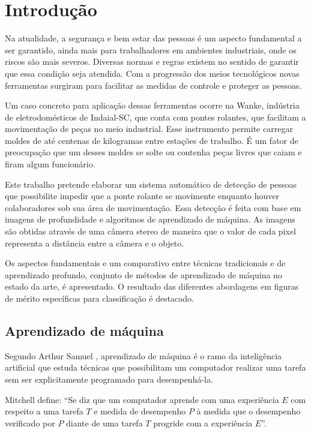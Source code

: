 \chapter{Introdução}

Na atualidade, a segurança e bem estar das pessoas é um aspecto fundamental a ser garantido, ainda mais para trabalhadores em ambientes industriais, onde os riscos são mais severos. Diversas normas e regras existem no sentido de garantir que essa condição seja atendida. Com a progressão dos meios tecnológicos novas ferramentas surgiram para facilitar as medidas de controle e proteger as pessoas.

Um caso concreto para aplicação dessas ferramentas ocorre na Wanke, indústria de eletrodomésticos de Indaial-SC, que conta com pontes rolantes, que facilitam a movimentação de peças no meio industrial. Esse instrumento permite carregar moldes de até centenas de kilogramas entre estações de trabalho. É um fator de preocupação que um desses moldes se solte ou contenha peças livres que caiam e firam algum funcionário. 

Este trabalho pretende elaborar um sistema automático de detecção de pessoas que possibilite impedir que a ponte rolante se movimente enquanto houver colaboradores sob sua área de movimentação. Essa detecção é feita com base em imagens de profundidade e algoritmos de aprendizado de máquina. As imagens são obtidas através de uma câmera stereo de maneira que o valor de cada pixel representa a distância entre a câmera e o objeto. 

Os aspectos fundamentais e um comparativo entre técnicas tradicionais e de aprendizado profundo, conjunto de métodos de aprendizado de máquina no estado da arte, é apresentado. O resultado das diferentes abordagens em figuras de mérito específicas para classificação é destacado.

\section{Aprendizado de máquina}
Segundo Arthur Samuel \cite{Samuel59somestudies}, aprendizado de máquina é o ramo da inteligência artificial que estuda técnicas que possibilitam um computador realizar uma tarefa sem ser explicitamente programado para desempenhá-la. 

Mitchell \cite{Mitchell:ML} define: ``Se diz que um computador aprende com uma experiência $E$ com respeito a uma tarefa $T$ e medida de desempenho $P$ à medida que o desempenho verificado por $P$ diante de uma tarefa $T$ progride com a experiência $E$''. 


